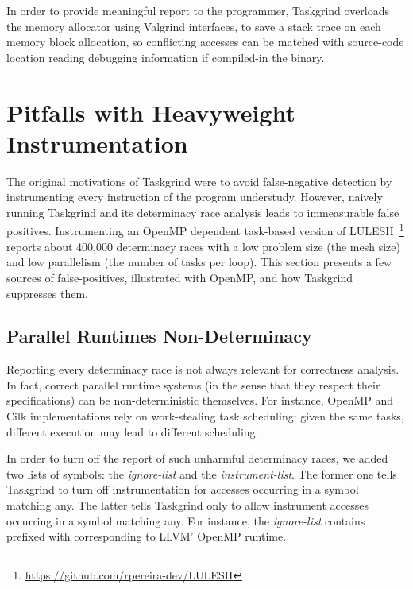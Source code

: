 In order to provide meaningful report to the programmer, Taskgrind overloads the memory allocator using Valgrind interfaces, to save a stack trace on each memory block allocation, so conflicting accesses can be matched with source-code location reading debugging information if compiled-in the binary.
    
\section{Pitfalls with Heavyweight Instrumentation} \label{sec:pitfalls}

The original motivations of Taskgrind were to avoid false-negative detection by instrumenting every instruction of the program understudy.
However, naively running Taskgrind and its determinacy race analysis leads to immeasurable false positives.
Instrumenting an OpenMP dependent task-based version of LULESH~\footnote{\url{https://github.com/rpereira-dev/LULESH}} reports about 400,000 determinacy races with a low problem size  (the mesh size) and low parallelism  (the number of tasks per loop).
This section presents a few sources of false-positives, illustrated with OpenMP, and how Taskgrind suppresses them.

\subsection{Parallel Runtimes Non-Determinacy}
Reporting every determinacy race is not always relevant for correctness analysis.
In fact, correct parallel runtime systems (in the sense that they respect their specifications) can be non-deterministic themselves.
For instance, OpenMP and Cilk implementations rely on work-stealing task scheduling: given the same tasks, different execution may lead to different scheduling.

In order to turn off the report of such unharmful determinacy races, we added two lists of symbols: the \emph{ignore-list} and the \emph{instrument-list}.
The former one tells Taskgrind to turn off instrumentation for accesses occurring in a symbol matching any.
The latter tells Taskgrind only to allow instrument accesses occurring in a symbol matching any.
For instance, the \emph{ignore-list} contains prefixed with  corresponding to LLVM' OpenMP runtime.

